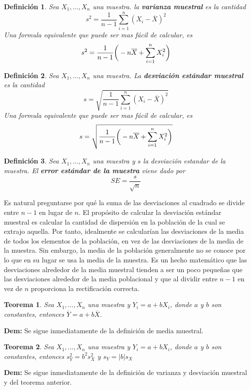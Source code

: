 \documentclass[10pt,a4paper]{book}
\newtheorem{defi}{\textbf{Definición}}
\newtheorem{teo}{\textbf{Teorema}}
\begin{document}
\begin{defi}
	Sea $ X_1, \ldots, X_n $ una muestra. la \textbf{varianza muestral} es la cantidad 
	$$ s^2 = \frac{1}{n-1} \sum_{i=1}^{n} (X_i - \overline{X})^2$$
	Una formula equivalente que puede ser mas fácil de calcular, es
	$$ s^2 = \frac{1}{n-1} \bigg{(} - n\overline{X} + \sum_{i=1}^{n} X^2_i \bigg{)}$$
\end{defi}

\begin{defi}
	Sea $ X_1, \ldots, X_n $ una muestra. La \textbf{desviación estándar muestral} es la cantidad
	$$ s = \sqrt{ \frac{1}{n-1} \sum_{i=1}^{n} (X_i - \overline{X})^2}$$
	Una formula equivalente que puede ser mas fácil de calcular, es
	$$ s = \sqrt{ \frac{1}{n-1} \bigg{(} - n\overline{X} + \sum_{i=1}^{n} X^2_i \bigg{)} }$$
\end{defi}

\begin{defi}
	Sea $ X_1, \ldots, X_n $ una muestra y $ s $ la desviación estandar de la muestra. El \textbf{error estándar de la muestra} viene dado por $$ SE = \frac{s}{\sqrt{n}}$$
\end{defi}

Es natural preguntarse por qué la suma de las desviaciones al cuadrado se divide entre $ n-1 $ en lugar de $ n $. El propósito de calcular la desviación estándar muestral es calcular la cantidad de dispersión en la población de la cual se extrajo aquella. Por tanto, idealmente se calcularían las desviaciones de la media de todos los elementos de la población, en vez de las desviaciones de la media de la muestra. Sin embargo, la media de la población generalmente no se conoce por lo que en su lugar se usa la media de la muestra. Es un hecho matemático que las desviaciones alrededor de la media muestral tienden a ser un poco pequeñas que las desviaciones alrededor de la media poblacional y que al dividir entre $ n-1 $ en vez de $ n $ proporciona la rectificación correcta.

\begin{teo}\label{LinealidadDeLaMedia}
	Sea $ X_1, \ldots, X_n $ una muestra y $ Y_i = a + bX_i $, donde $ a $ y $ b $ son constantes, entonces $ \overline{Y} = a +b\overline{X} $.	
\end{teo}
\textbf{Dem:} Se sigue inmediatamente de la definición de media muestral.

\begin{teo}\label{LinealidadDeLaDesviacion}
	Sea $ X_1, \ldots, X_n $ una muestra y $ Y_i = a + bX_i $, donde $ a $ y $ b $ son constantes, entonces $s^2_Y= b^2 s^2_X$ y $s_Y = |b|s_X$
\end{teo}
\textbf{Dem:} Se sigue inmediatamente de la definición de varianza y desviación muestral y del teorema anterior.
\end{document}

